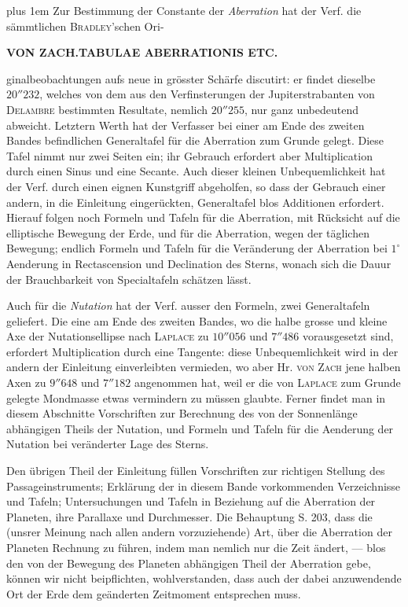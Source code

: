 \begingroup\rightskip=0pt plus 1em
Zur Bestimmung der Constante der \emph{Aberration} hat der Verf. die sämmtlichen \textsc{Bradley}'schen Ori-\par
\clearpage
\noindent{}%
\makebox[12mm][l]{}%
\parbox[t]{\dimexpr\linewidth-24mm\relax}{\centering\footnotesize\bfseries VON ZACH.\enspace TABULAE ABERRATIONIS ETC.\par}%
\par\nobreak\medskip
\noindent ginalbeobachtungen aufs neue in grösster Schärfe discutirt: er findet dieselbe $20''232$, welches von dem aus den Verfinsterungen der Jupiterstrabanten von \textsc{Delambre} bestimmten Resultate, nemlich $20''255$, nur ganz unbedeutend abweicht. Letztern Werth hat der Verfasser bei einer am Ende des zweiten Bandes befindlichen Generaltafel für die Aberration zum Grunde gelegt. Diese Tafel nimmt nur zwei Seiten ein; ihr Gebrauch erfordert aber Multiplication durch einen Sinus und eine Secante. Auch dieser kleinen Unbequemlichkeit hat der Verf. durch einen eignen Kunstgriff abgeholfen, so dass der Gebrauch einer andern, in die Einleitung eingerückten, Generaltafel blos Additionen erfordert. Hierauf folgen noch Formeln und Tafeln für die Aberration, mit Rücksicht auf die elliptische Bewegung der Erde, und für die Aberration, wegen der täglichen Bewegung; endlich Formeln und Tafeln für die Veränderung der Aberration bei $1^\circ$ Aenderung in Rectascension und Declination des Sterns, wonach sich die Dauur der Brauchbarkeit von Specialtafeln schätzen lässt.\par\endgroup

Auch für die \emph{Nutation} hat der Verf. ausser den Formeln, zwei Generaltafeln geliefert. Die eine am Ende des zweiten Bandes, wo die halbe grosse und kleine Axe der Nutationsellipse nach \textsc{Laplace} zu $10''056$ und $7''486$ vorausgesetzt sind, erfordert Multiplication durch eine Tangente: diese Unbequemlichkeit wird in der andern der Einleitung einverleibten vermieden, wo aber Hr. \textsc{von Zach} jene halben Axen zu $9''648$ und $7''182$ angenommen hat, weil er die von \textsc{Laplace} zum Grunde gelegte Mondmasse etwas vermindern zu müssen glaubte. Ferner findet man in diesem Abschnitte Vorschriften zur Berechnung des von der Sonnenlänge abhängigen Theils der Nutation, und Formeln und Tafeln für die Aenderung der Nutation bei veränderter Lage des Sterns.

Den übrigen Theil der Einleitung füllen Vorschriften zur richtigen Stellung des Passageinstruments; Erklärung der in diesem Bande vorkommenden Verzeichnisse und Tafeln; Untersuchungen und Tafeln in Beziehung auf die Aberration der Planeten, ihre Parallaxe und Durchmesser. Die Behauptung S. 203, dass die (unsrer Meinung nach allen andern vorzuziehende) Art, über die Aberration der Planeten Rechnung zu führen, indem man nemlich nur die Zeit ändert, --- blos den von der Bewegung des Planeten abhängigen Theil der Aberration gebe, können wir nicht beipflichten, wohlverstanden, dass auch der dabei anzuwendende Ort der Erde dem geänderten Zeitmoment entsprechen muss.

